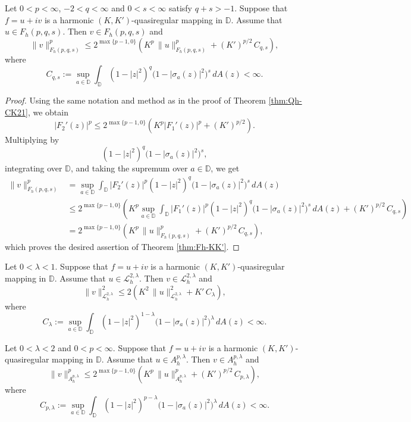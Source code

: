 \documentclass[12pt, reqno]{amsart}
\begin{document}
\begin{theorem}\label{thm:Fh-KK'}
Let $0<p<\infty$, $-2<q<\infty$ and $0<s<\infty$ satisfy $q+s>-1$.
Suppose that $f=u+iv$ is a harmonic $(K,K')$-quasiregular mapping in $\mathbb D$.
Assume that $u\in F_h(p,q,s)$. Then $v\in F_h(p,q,s)$ and
\[
\|v\|_{F_h(p,q,s)}^{p}\le 2^{\max\{p-1,0\}}
\left(K^{p}\,\|u\|_{F_h(p,q,s)}^{p}+(K')^{p/2}\,C_{q,s}\right),
\]
where
\[
C_{q,s}:=\sup_{a\in\mathbb D}\int_{\mathbb D}(1-|z|^{2})^{q}\bigl(1-|\sigma_a(z)|^{2}\bigr)^{s}\,dA(z)<\infty.
\]
\end{theorem}

\begin{proof}
Using the same notation and method as in the proof of Theorem \ref{thm:Qh-CK21},
we obtain
\[
|F_2'(z)|^{p}
\le 2^{\max\{p-1,0\}}
\left(
K^{p}|F_1'(z)|^{p}
+(K')^{p/2}
\right).
\]
Multiplying by $$(1-|z|^{2})^{q}\bigl(1-|\sigma_a(z)|^{2}\bigr)^{s},$$ integrating over $\mathbb D$, and taking the supremum over $a\in\mathbb D$, we get
\begin{align*}
\|v\|_{F_h(p,q,s)}^{p}
&=\sup_{a\in\mathbb D}\int_{\mathbb D}|F_2'(z)|^{p}(1-|z|^{2})^{q}\bigl(1-|\sigma_a(z)|^{2}\bigr)^{s}\,dA(z)\\
&\le 2^{\max\{p-1,0\}}
\left(
K^{p}\sup_{a\in\mathbb D}\int_{\mathbb D}|F_1'(z)|^{p}(1-|z|^{2})^{q}\bigl(1-|\sigma_a(z)|^{2}\bigr)^{s}\,dA(z)
+(K')^{p/2}\,C_{q,s}
\right)\\
&=2^{\max\{p-1,0\}}
\left(
K^{p}\,\|u\|_{F_h(p,q,s)}^{p}+(K')^{p/2}\,C_{q,s}
\right),
\end{align*}
which proves the desired assertion of Theorem \ref{thm:Fh-KK'}.
\end{proof}

\begin{coro}\label{coro:morrey-KK'}
Let $0<\lambda<1$. Suppose that $f=u+iv$ is a harmonic $(K,K')$-quasiregular mapping in $\mathbb D$.
Assume that $u\in \mathcal{L}_{h}^{2,\lambda}$.
Then $v\in \mathcal{L}_{h}^{2,\lambda}$ and
\[
\|v\|_{\mathcal{L}_{h}^{2,\lambda}}^{2}
\le
2\left(
K^{2}\,\|u\|_{\mathcal{L}_{h}^{2,\lambda}}^{2}+K'\,C_{\lambda}
\right),
\]
where
\[
C_{\lambda}:=\sup_{a\in\mathbb D}\int_{\mathbb D}
(1-|z|^{2})^{1-\lambda}\bigl(1-|\sigma_a(z)|^{2}\bigr)^{\lambda}\,dA(z)<\infty.
\]
\end{coro}

\begin{coro}\label{coro:bergman-morrey-KK'}
Let $0<\lambda<2$ and $0<p<\infty$. Suppose that $f=u+iv$ is a harmonic $(K,K')$-quasiregular mapping in $\mathbb D$.
Assume that $u\in A_{h}^{p,\lambda}$.
Then $v\in A_{h}^{p,\lambda}$ and
\[
\|v\|_{A_{h}^{p,\lambda}}^{p}
\le
2^{\max\{p-1,0\}}
\left(
K^{p}\,\|u\|_{A_{h}^{p,\lambda}}^{p}+(K')^{p/2}\,C_{p,\lambda}
\right),
\]
where
\[
C_{p,\lambda}:=\sup_{a\in\mathbb D}\int_{\mathbb D}
(1-|z|^{2})^{p-\lambda}\bigl(1-|\sigma_a(z)|^{2}\bigr)^{\lambda}\,dA(z)<\infty.
\]
\end{coro}
\end{document}
